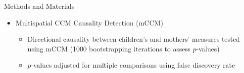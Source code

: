 \documentclass[final]{beamer}
\begin{document}
\begin{frame}{}
\begin{textblock}{34}
\begin{block}{Methods and Materials}
\begin{itemize}
\begin{itemize}
\end{itemize}
\end{itemize}
\begin{itemize}
\item \text{ }Multispatial CCM Causality Detection (mCCM) \cite{Clark15}
\begin{itemize}
\item \text{ }Directional causality between children's and mothers' measures tested using mCCM  (1000 bootstrapping iterations to assess $p$-values)
\item \text{ }$p$-values adjusted for multiple comparisons using false discovery rate \cite{Benjamini01}
\end{itemize}
\end{itemize}
\end{block}


\end{textblock}
\end{frame}
\end{document}

